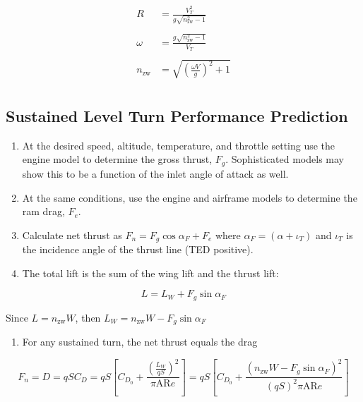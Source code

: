 \documentclass[
]{book}
\providecommand{\tightlist}{%
  \setlength{\itemsep}{0pt}\setlength{\parskip}{0pt}}
\begin{document}
\begin{align}
R &= \frac{V_T^2}{g \sqrt{n_{\text{zw}}^2 - 1}} \\
\\
\omega &= \frac{g \sqrt{n_{\text{zw}}^2 - 1}}{V_T} \\
\\
n_{\text{zw}} &= \sqrt{ \left( \frac{\omega V}{g} \right)^2 + 1  } \\
\label{eq:r-omega-n-zw}
\end{align}

\hypertarget{sustained-level-turn-performance-prediction}{%
\subsection{Sustained Level Turn Performance Prediction}\label{sustained-level-turn-performance-prediction}}

\begin{enumerate}
\def\labelenumi{\arabic{enumi}.}
\item
  At the desired speed, altitude, temperature, and throttle setting use the
  engine model to determine the gross thrust, \(F_g\). Sophisticated models may
  show this to be a function of the inlet angle of attack as well.
\item
  At the same conditions, use the engine and airframe models to determine the
  ram drag, \(F_e\).
\item
  Calculate net thrust as \(F_n = F_g \cos \alpha_F + F_e\) where
  \(\alpha_F = \left(\alpha + \iota_T \right)\) and \(\iota_T\) is the incidence angle of
  the thrust line (TED positive).
\item
  The total lift is the sum of the wing lift and the thrust lift:
\end{enumerate}

\[
L = L_W + F_g \sin \alpha_F
\]

Since \(L = n_{\text{zw}} W\), then \(L_W = n_{\text{zw}} W - F_g \sin \alpha_F\)

\begin{enumerate}
\def\labelenumi{\arabic{enumi}.}
\setcounter{enumi}{4}
\tightlist
\item
  For any sustained turn, the net thrust equals the drag
\end{enumerate}

\[
F_n = D = qSC_D = 
qS \left[ 
      C_{D_0} + 
      \frac{\left( \frac{L_W}{qS} \right)^2}{\pi \mathrm{AR}e} 
   \right] =
qS \left[
      C_{D_0} + 
      \frac{\left( n_{\text{zw}} W - F_g \sin \alpha_F \right)^2}
           {\left(qS\right)^2 \pi \mathrm{AR}e} 
   \right]
\]
\end{document}
